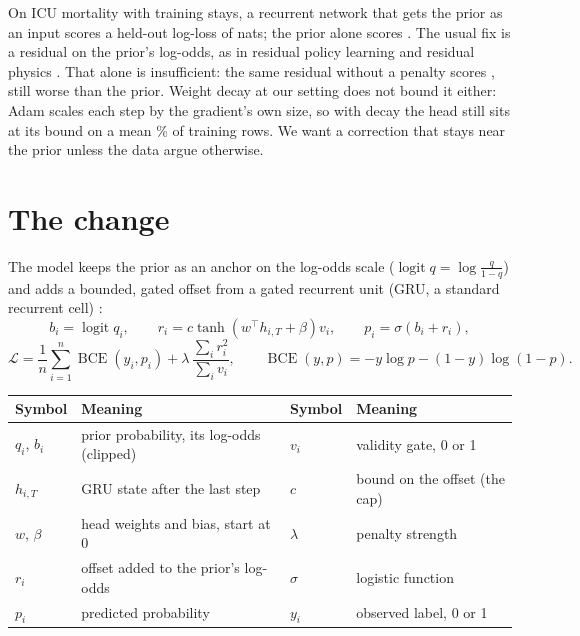 \documentclass{article}
\begin{document}
On ICU mortality with \nSizeD{} training stays, a recurrent network that gets the prior
as an input scores a held-out log-loss of \nPhysDUnanchLL{} nats; the prior alone scores \nPhysDPriorLL. The usual
fix is a residual on the prior's log-odds, as in residual policy learning
\citep{silver2018residual,johannink2019residual} and residual physics \citep{zeng2020tossingbot}. That alone is
insufficient: the same residual without a penalty scores \nPhysDLzeroLL, still worse than the prior. Weight decay at
our setting does not bound it either: Adam scales each step by the gradient's own size, so with decay \nNetWd{} the head still sits at its bound
on a mean \nPhysDLzeroAtCap\% of training rows. We want a correction that stays near the prior unless the data argue
otherwise.

\section{The change}
\label{sec:change}

The model keeps the prior as an anchor on the log-odds scale ($\operatorname{logit} q = \log\frac{q}{1-q}$) and adds a bounded, gated offset from a gated recurrent
unit (GRU, a standard recurrent cell) \citep{cho2014gru}:
\begin{equation}
\label{eq:model}
b_i = \operatorname{logit} q_i, \qquad
r_i = c \tanh\!\left(w^{\top} h_{i,T} + \beta\right) v_i, \qquad
p_i = \sigma\!\left(b_i + r_i\right),
\end{equation}
\begin{equation}
\label{eq:loss}
\mathcal{L} = \frac{1}{n}\sum_{i=1}^{n} \operatorname{BCE}\!\left(y_i, p_i\right)
  + \lambda \, \frac{\sum_{i} r_i^{2}}{\sum_{i} v_i},
\qquad \operatorname{BCE}(y,p) = -y\log p - (1-y)\log(1-p).
\end{equation}
\begin{center}
\small
\begin{tabular}{@{}ll@{\hskip 1.5em}ll@{}}
\toprule
Symbol & Meaning & Symbol & Meaning \\
\midrule
$q_i$, $b_i$ & prior probability, its log-odds (clipped) & $v_i$ & validity gate, 0 or 1 \\
$h_{i,T}$ & GRU state after the last step & $c$ & bound on the offset (the cap) \\
$w$, $\beta$ & head weights and bias, start at 0 & $\lambda$ & penalty strength \\
$r_i$ & offset added to the prior's log-odds & $\sigma$ & logistic function \\
$p_i$ & predicted probability & $y_i$ & observed label, 0 or 1 \\
\bottomrule
\end{tabular}
\end{center}
\end{document}
